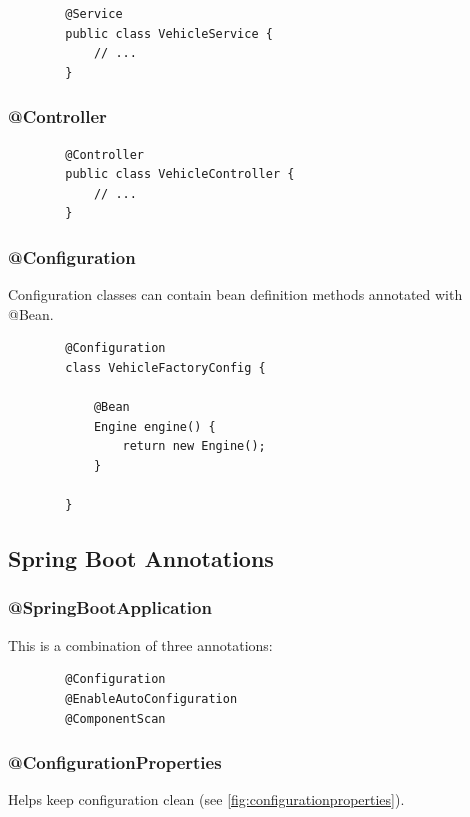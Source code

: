 \documentclass{scrartcl}
\begin{document}
    \begin{lstlisting}
        @Service
        public class VehicleService {
            // ...
        }
    \end{lstlisting}

\subsubsection{@Controller}

    \begin{lstlisting}
        @Controller
        public class VehicleController {
            // ...
        }
    \end{lstlisting}

\subsubsection{@Configuration}

    Configuration classes can contain bean definition methods annotated with @Bean.

    \begin{lstlisting}
        @Configuration
        class VehicleFactoryConfig {

            @Bean
            Engine engine() {
                return new Engine();
            }

        }
    \end{lstlisting}


\subsection{Spring Boot Annotations}
\subsubsection{@SpringBootApplication}

    This is a combination of three annotations:

    \begin{lstlisting}
        @Configuration
        @EnableAutoConfiguration
        @ComponentScan
    \end{lstlisting}

\subsubsection{@ConfigurationProperties}

    Helps keep configuration clean (see \ref{fig:configurationproperties}).
\end{document}
